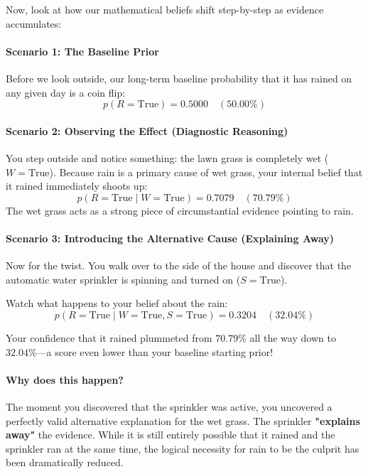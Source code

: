 \documentclass{article}
\begin{document}
Now, look at how our mathematical beliefs shift step-by-step as evidence accumulates:

\paragraph{Scenario 1: The Baseline Prior}
Before we look outside, our long-term baseline probability that it has rained on any given day is a coin flip:
\begin{equation}
p(R = \text{True}) = 0.5000 \quad (50.00\%) \tag{142}
\end{equation}

\paragraph{Scenario 2: Observing the Effect (Diagnostic Reasoning)}
You step outside and notice something: the lawn grass is completely wet ($W = \text{True}$). Because rain is a primary cause of wet grass, your internal belief that it rained immediately shoots up:
\begin{equation}
p(R = \text{True} \mid W = \text{True}) = 0.7079 \quad (70.79\%) \tag{143}
\end{equation}
The wet grass acts as a strong piece of circumstantial evidence pointing to rain.

\paragraph{Scenario 3: Introducing the Alternative Cause (Explaining Away)}
Now for the twist. You walk over to the side of the house and discover that the automatic water sprinkler is spinning and turned on ($S = \text{True}$). 

Watch what happens to your belief about the rain:
\begin{equation}
p(R = \text{True} \mid W = \text{True}, S = \text{True}) = 0.3204 \quad (32.04\%) \tag{144}
\end{equation}

Your confidence that it rained plummeted from $70.79\%$ all the way down to $32.04\%$—a score even lower than your baseline starting prior! 

\paragraph{Why does this happen?} 
The moment you discovered that the sprinkler was active, you uncovered a perfectly valid alternative explanation for the wet grass. The sprinkler \textbf{"explains away"} the evidence. While it is still entirely possible that it rained and the sprinkler ran at the same time, the logical necessity for rain to be the culprit has been dramatically reduced. 
\end{document}
